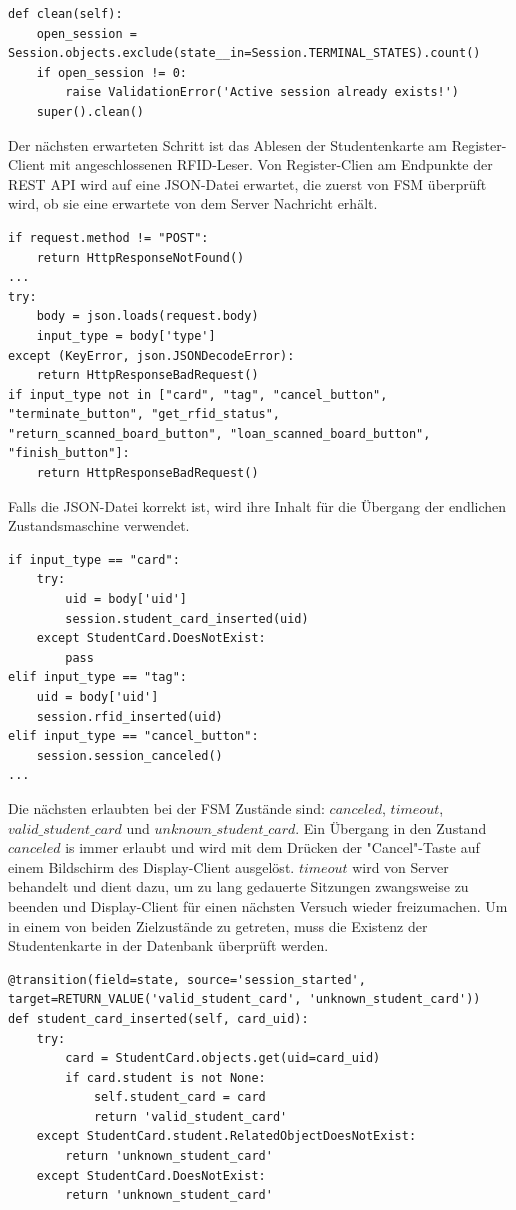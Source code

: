 \begin{lstlisting}[caption={Session clean() für die Validation des Modells},captionpos=b]
def clean(self):
	open_session = Session.objects.exclude(state__in=Session.TERMINAL_STATES).count()
	if open_session != 0:
		raise ValidationError('Active session already exists!')
	super().clean()
\end{lstlisting}

Der nächsten erwarteten Schritt ist das Ablesen der Studentenkarte am Register-Client mit angeschlossenen RFID-Leser. Von Register-Clien am Endpunkte der REST API wird auf eine JSON-Datei erwartet, die zuerst von FSM überprüft wird, ob sie eine erwartete von dem Server Nachricht erhält. 

\begin{lstlisting}[caption={Events-Ansicht in Django, JSON-Parsing},captionpos=b]
if request.method != "POST":
	return HttpResponseNotFound()
...
try:
	body = json.loads(request.body)
	input_type = body['type']
except (KeyError, json.JSONDecodeError):
	return HttpResponseBadRequest()	
if input_type not in ["card", "tag", "cancel_button", "terminate_button", "get_rfid_status",
"return_scanned_board_button", "loan_scanned_board_button", "finish_button"]:
	return HttpResponseBadRequest()
\end{lstlisting}
Falls die JSON-Datei korrekt ist, wird ihre Inhalt für die Übergang der endlichen Zustandsmaschine verwendet.
\begin{lstlisting}[caption={Events-Ansicht in Django, Aufur von FSM Transitions},captionpos=b]
if input_type == "card":
	try:
		uid = body['uid']
		session.student_card_inserted(uid)
	except StudentCard.DoesNotExist:
		pass
elif input_type == "tag":
	uid = body['uid']
	session.rfid_inserted(uid)
elif input_type == "cancel_button":
	session.session_canceled()
...
\end{lstlisting}



Die nächsten erlaubten bei der FSM Zustände sind: $canceled$, $timeout$, $valid\_student\_card$ und $unknown\_student\_card$. Ein Übergang in den Zustand $canceled$ is immer erlaubt und wird mit dem Drücken der "Cancel"-Taste auf einem Bildschirm des Display-Client ausgelöst. $timeout$ wird von Server behandelt und dient dazu, um zu lang gedauerte Sitzungen zwangsweise zu beenden und Display-Client für einen nächsten Versuch wieder freizumachen. Um in einem von beiden Zielzustände zu getreten, muss die Existenz der Studentenkarte in der Datenbank überprüft werden. 
\begin{lstlisting}[caption={FSM Übergang beim Ablesen der Studentenkarte},captionpos=b]
@transition(field=state, source='session_started', target=RETURN_VALUE('valid_student_card', 'unknown_student_card'))
def student_card_inserted(self, card_uid):
	try:
		card = StudentCard.objects.get(uid=card_uid)
		if card.student is not None:
			self.student_card = card
			return 'valid_student_card'
	except StudentCard.student.RelatedObjectDoesNotExist:
		return 'unknown_student_card'
	except StudentCard.DoesNotExist:
		return 'unknown_student_card'
\end{lstlisting}

